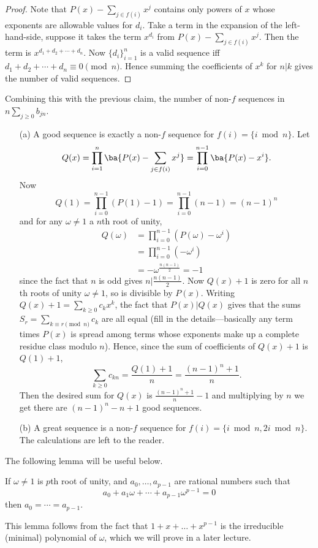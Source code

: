 \begin{proof}
Note that $P(x)-\sum_{j\in f(i)} x^j$ contains only powers of $x$ whose exponents  are allowable values for $d_i$. Take a term in the expansion of the left-hand-side, suppose it takes the term $x^{d_i}$ from $P(x)-\sum_{j\in f(i)} x^j$. Then the term is $x^{d_1+d_2+\cdots +d_n}$. Now $\{d_i\}_{i=1}^n$ is a valid sequence iff $d_1+d_2+\cdots +d_n\equiv 0\pmod n$. Hence summing the coefficients of $x^k$ for $n|k$ gives the number of valid sequences.
\end{proof}
Combining this with the previous claim, the number of non-$f$ sequences in $n\sum_{j\geq 0}b_{jn}$.
\begin{enumerate}
\item[(a)] A good sequence is exactly a non-$f$ sequence for $f(i)=\{i\bmod n\}$. Let
\[Q(x)=\prod_{i=1}^n\ba{P(x)-\sum_{j\in f(i)}x^j} =\prod_{i=0}^{n-1}\ba{P(x)-x^i}.\]
Now 
\[Q(1)=\prod_{i=0}^{n-1}(P(1)-1)=\prod_{i=0}^{n-1} (n-1) =(n-1)^n\] and for any $\omega\neq 1$ a $n$th root of unity,
\begin{align*}
Q(\omega)&=\prod_{i=0}^{n-1} (P(\omega)-\omega^i)\\ &=\prod_{i=0}^{n-1}(-\omega^i)\\
&=-\omega^{\frac{n(n-1)}{2}}=-1
\end{align*}
since the fact that $n$ is odd gives $n|\frac{n(n-1)}{2}$. Now $Q(x)+1$ is zero for all $n$th roots of unity $\omega\neq 1$, so is divisible by $P(x)$. Writing 
$Q(x)+1=\sum_{k\geq 0} c_kx^k$, the fact that $P(x)|Q(x)$ gives that the sums $S_r=\sum_{k\equiv r\pmod n}c_k$ are all equal (fill in the details---basically any term times $P(x)$ is spread among terms whose exponents make up a complete residue class modulo $n$). Hence, since the sum of coefficients of $Q(x)+1$ is $Q(1)+1$, 
\[\sum_{k\geq 0} c_{kn}=\frac{Q(1)+1}{n}=\frac{(n-1)^n+1}{n}.\]
Then the desired sum for $Q(x)$ is $\frac{(n-1)^n+1}{n}-1$ and multiplying by $n$ we get there are $(n-1)^n-n+1$ good sequences.
\item[(b)] A great sequence is a non-$f$ sequence for $f(i)=\{i\bmod n,2i\bmod n\}$. The calculations are left to the reader.
\end{enumerate}
The following lemma will be useful below.
\begin{lem}
If $\omega\neq 1$ is $p$th root of unity, and $a_0,\ldots, a_{p-1}$ are rational numbers such that 
\[
a_0+a_1\omega+\cdots +a_{p-1}\omega^{p-1}=0
\]
then $a_0=\cdots= a_{p-1}$.
\end{lem}
This lemma follows from the fact that $1+x+\ldots +x^{p-1}$ is the irreducible (minimal) polynomial of $\omega$, which we will prove in a later lecture.
